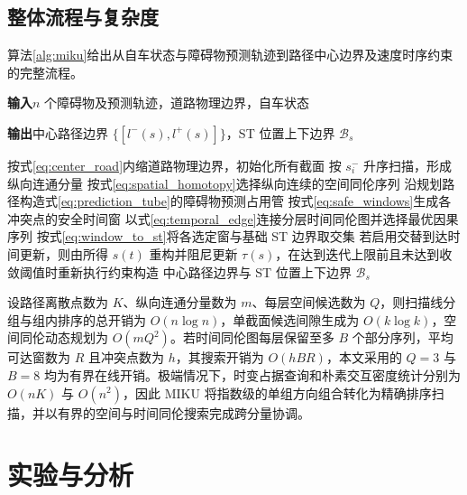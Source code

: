 \documentclass[a4paper,zihao=5]{ctexart}
\theoremstyle{definition}
\begin{document}
\subsection{整体流程与复杂度}
\label{sec:method_algorithm}

算法\ref{alg:miku}给出从自车状态与障碍物预测轨迹到路径中心边界及速度时序约束的完整流程。

\begin{algorithm}[htbp]
\small
\caption{MIKU 多障碍物约束统一流程}
\label{alg:miku}
\textbf{输入}\quad $n$ 个障碍物及预测轨迹，道路物理边界，自车状态\par
\textbf{输出}\quad 中心路径边界 $\{[l^{-}(s),l^{+}(s)]\}$，ST 位置上下边界 $\mathcal B_s$\par
按式\eqref{eq:center_road}内缩道路物理边界，初始化所有截面\;
按 $s_i^-$ 升序扫描，形成纵向连通分量\;
按式\eqref{eq:spatial_homotopy}选择纵向连续的空间同伦序列\;
沿规划路径构造式\eqref{eq:prediction_tube}的障碍物预测占用管\;
按式\eqref{eq:safe_windows}生成各冲突点的安全时间窗\;
以式\eqref{eq:temporal_edge}连接分层时间同伦图并选择最优因果序列\;
按式\eqref{eq:window_to_st}将各选定窗与基础 ST 边界取交集\;
若启用交替到达时间更新，则由所得 $s(t)$ 重构并阻尼更新 $\tau(s)$，在达到迭代上限前且未达到收敛阈值时重新执行约束构造\;
\KwRet 中心路径边界与 ST 位置上下边界 $\mathcal B_s$
\end{algorithm}

设路径离散点数为 $K$、纵向连通分量数为 $m$、每层空间候选数为 $Q$，则扫描线分组与组内排序的总开销为 $O(n\log n)$，单截面候选间隙生成为 $O(k\log k)$，空间同伦动态规划为 $O(mQ^2)$。若时间同伦图每层保留至多 $B$ 个部分序列，平均可达窗数为 $R$ 且冲突点数为 $h$，其搜索开销为 $O(hBR)$，本文采用的 $Q=3$ 与 $B=8$ 均为有界在线开销。极端情况下，时变占据查询和朴素交互密度统计分别为 $O(nK)$ 与 $O(n^2)$，因此 MIKU 将指数级的单组方向组合转化为精确排序扫描，并以有界的空间与时间同伦搜索完成跨分量协调。

\section{实验与分析}
\label{sec:experiment}
\end{document}
